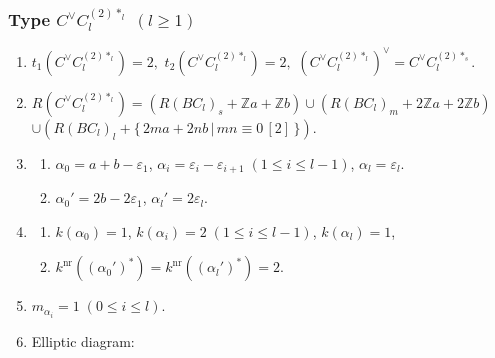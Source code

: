 \documentclass[11pt]{amsart}
\newcommand{\Z}{\mathbb{Z}}
\newcommand{\nr}{\mathrm{nr}}
\newcommand{\vep}{\varepsilon}
\begin{document}
{%
\subsubsection{Type $C^\vee C_l^{(2)\ast_l}$ $(l\geq 1)$}\label{data:CC-7}
\begin{enumerate}
\item $t_1(C^\vee C_l^{(2)\ast_l})=2,$ \quad $t_2(C^\vee C_l^{(2)\ast_l})=2,$ \quad $(C^\vee C_l^{(2)\ast_l})^\vee = C^\vee C_l^{(2)\ast_s}.$
\item $R(C^\vee C_l^{(2)\ast_l})=(R(BC_l)_s+\Z a+\Z b)\cup (R(BC_l)_m+2\Z a+2\Z b) $ \\ 
 $\cup (R(BC_l)_l+\{ \,2ma+2nb\, \vert\, mn \equiv 0\, [2]\,\})$. 
\item 
\begin{enumerate}
\item[i)] $\alpha_0= a+b-\vep_1$, $\alpha_i=\vep_i-\vep_{i+1}\; 
(1\leq i \leq l-1)$, $\alpha_l=\vep_l$. 
\item[ii)] $\alpha_0'=2b-2\vep_1$, \; $\alpha_l'=2\vep_l$.
\end{enumerate}
\item 
\begin{enumerate}
\item[i)] $k(\alpha_0)=1$, \; $k(\alpha_i)=2\; 
(1\leq i \leq l-1)$, \; $k(\alpha_l)=1$, 
\item[ii)] $k^{\nr}((\alpha_0')^\ast)= k^{\nr}((\alpha_l')^\ast)=2$. 
\end{enumerate}
\item $m_{\alpha_i}=1\; (0 \leq i \leq l)$. 
\item Elliptic diagram: 




\begin{center}
\end{center}
\end{enumerate}}
\end{document}
